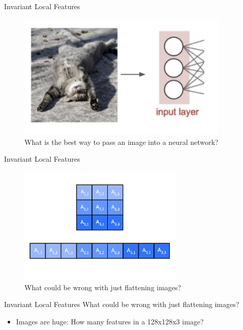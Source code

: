 \begin{frame}{Invariant Local Features}
\begin{figure}
    \centering
    \includegraphics[width=0.9\textwidth]{img/catinput.png}
    \caption{What is the best way to pass an image into a neural network?}
\end{figure}
\end{frame}

\begin{frame}{Invariant Local Features}
\begin{figure}
    \centering
    \includegraphics[width=0.7\textwidth]{img/flatten.png}
    \caption{What could be wrong with just flattening images?}
\end{figure}
\end{frame}

\begin{frame}{Invariant Local Features}
What could be wrong with just flattening images?
\begin{itemize}
    \item Images are huge: How many features in a 128x128x3 image?
\end{itemize}
\end{frame}

